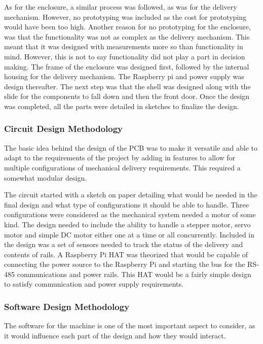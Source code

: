 \documentclass[a4paper,11pt]{article}
\numberwithin{figure}{section}
\numberwithin{table}{section}
\begin{document}
As for the enclosure, a similar process was followed, as was for the delivery mechanism. However, no prototyping was included as the cost for prototyping would have been too high. Another reason for no prototyping for the enclosure, was that the functionality was not as complex as the delivery mechanism. This meant that it was designed with measurements more so than functionality in mind. However, this is not to say functionality did not play a part in decision making. The frame of the enclosure was designed first, followed by the internal housing for the delivery mechanism. The Raspberry pi and power supply was design thereafter. The next step was that the shell was designed along with the slide for the components to fall down and then the front door. Once the design was completed, all the parts were detailed in sketches to finalize the design.

\subsubsection{Circuit Design Methodology}
The basic idea behind the design of the PCB was to make it versatile and able to adapt to the requirements of the project by adding in features to allow for multiple configurations of mechanical delivery requirements. This required a somewhat modular design.

The circuit started with a sketch on paper detailing what would be needed in the final design and what type of configurations it should be able to handle. Three configurations were considered as the mechanical system needed a motor of some kind. The design needed to include the ability to handle a stepper motor, servo motor and simple DC motor either one at a time or all concurrently. Included in the design was a set of sensors needed to track the status of the delivery and contents of rails. A Raspberry Pi HAT was theorized that would be capable of connecting the power source to the Raspberry Pi and starting the bus for the RS-485 communications and power rails. This HAT would be a fairly simple design to satisfy communication and power supply requirements.



\subsubsection{Software Design Methodology}
The software for the machine is one of the most important aspect to consider, as it would influence each part of the design and how they would interact.
\end{document}
